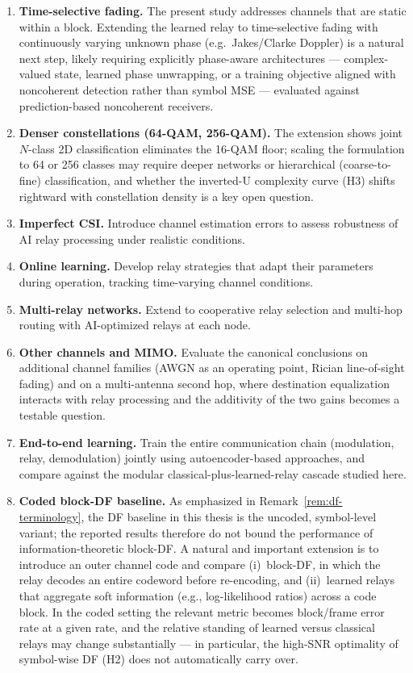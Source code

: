 \begin{enumerate}
\def\labelenumi{\arabic{enumi}.}
\item
  \textbf{Time-selective fading.} The present study addresses channels that are static within a block. Extending the learned relay to time-selective fading with continuously varying unknown phase (e.g.\ Jakes/Clarke Doppler) is a natural next step, likely requiring explicitly phase-aware architectures --- complex-valued state, learned phase unwrapping, or a training objective aligned with noncoherent detection rather than symbol MSE --- evaluated against prediction-based noncoherent receivers.
\item
  \textbf{Denser constellations (64-QAM, 256-QAM).} The extension shows joint $N$-class 2D classification eliminates the 16-QAM floor; scaling the formulation to 64 or 256 classes may require deeper networks or hierarchical (coarse-to-fine) classification, and whether the inverted-U complexity curve (H3) shifts rightward with constellation density is a key open question.
\item
  \textbf{Imperfect CSI.} Introduce channel estimation errors to assess robustness of AI relay processing under realistic conditions.
\item
  \textbf{Online learning.} Develop relay strategies that adapt their parameters during operation, tracking time-varying channel conditions.
\item
  \textbf{Multi-relay networks.} Extend to cooperative relay selection and multi-hop routing with AI-optimized relays at each node.
\item
  \textbf{Other channels and MIMO.} Evaluate the canonical conclusions on additional channel families (AWGN as an operating point, Rician line-of-sight fading) and on a multi-antenna second hop, where destination equalization interacts with relay processing and the additivity of the two gains becomes a testable question.
\item
  \textbf{End-to-end learning.} Train the entire communication chain (modulation, relay, demodulation) jointly using autoencoder-based approaches, and compare against the modular classical-plus-learned-relay cascade studied here.
\item
  \textbf{Coded block-DF baseline.} As emphasized in Remark~\ref{rem:df-terminology}, the DF baseline in this thesis is the uncoded, symbol-level variant; the reported results therefore do not bound the performance of information-theoretic block-DF. A natural and important extension is to introduce an outer channel code and compare (i)~block-DF, in which the relay decodes an entire codeword before re-encoding, and (ii)~learned relays that aggregate soft information (e.g., log-likelihood ratios) across a code block. In the coded setting the relevant metric becomes block/frame error rate at a given rate, and the relative standing of learned versus classical relays may change substantially --- in particular, the high-SNR optimality of symbol-wise DF (H2) does not automatically carry over.

\end{enumerate}
